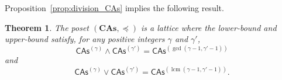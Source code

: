 \documentclass[10pt,reqno]{amsart}
\numberwithin{equation}{subsection}
\newtheorem{Theorem}{Theorem}[subsection]
\newcommand{\CAs}[1]{\mathsf{CAs}^{(#1)}}
\newcommand{\CAsAll}{\mathbf{CAs}}
\newcommand{\OrdCAs}{\preceq}
\DeclareMathOperator{\lcm}{lcm}
\begin{document}
Proposition~\ref{prop:division_CAs} implies the following result.
\medbreak

\begin{Theorem}\label{thm:lattice_CAs}
    The poset $\left(\CAsAll, \OrdCAs\right)$ is a lattice where
    the lower-bound and upper-bound satisfy, for any positive integers
    $\gamma$ and $\gamma'$,
    \begin{equation}
        \CAs{\gamma} \wedge \CAs{\gamma'}
        = \CAs{\gcd \left(\gamma-1, \gamma'-1\right)}
    \end{equation}
    and
    \begin{equation}
        \CAs{\gamma} \vee \CAs{\gamma'}
        = \CAs{\lcm \left(\gamma-1, \gamma'-1\right)}.
    \end{equation}
\end{Theorem}
\medbreak

\end{document}
